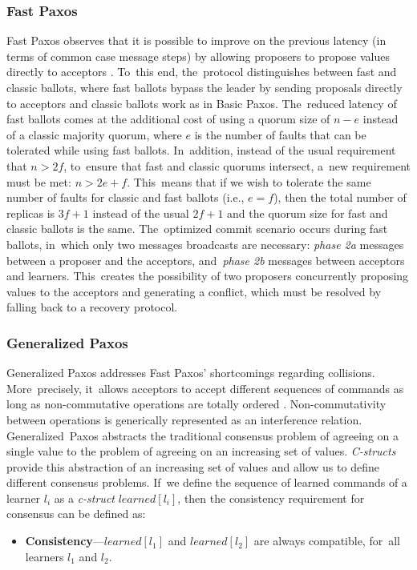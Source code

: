 \documentclass[algorithms,article,accept,moreauthors,pdftex,10pt,a4paper]{Definitions/mdpi}
\begin{document}
\subsubsection{Fast Paxos}
Fast Paxos observes that it is possible to improve on the previous latency (in terms of common case message steps) by allowing proposers to propose values directly to acceptors \cite{L06}. To~this end, the~protocol distinguishes between fast and classic ballots, where fast ballots bypass the leader by sending proposals directly to acceptors and classic ballots work as in Basic Paxos. The~reduced latency of fast ballots comes at the additional cost of using a quorum size of $n-e$ instead of a classic majority quorum, where $e$ is the number of faults that can be tolerated while using fast ballots. In~addition, instead of the usual requirement that $n> 2f$, to~ensure that fast and classic quorums intersect, a~new requirement must be met: $n > 2e+f$. This~means that if we wish to tolerate the same number of faults for classic and fast ballots (i.e., $e=f$), then the total number of replicas is $3f+1$ instead of the usual $2f+1$ and the quorum size for fast and classic ballots is the same. The~optimized commit scenario occurs during fast ballots, in~which only two messages broadcasts are necessary: \textit{phase 2a} messages between a proposer and the acceptors, and~\textit{phase 2b} messages between acceptors and learners. This~creates the possibility of two proposers concurrently proposing values to the acceptors and generating a conflict, which must be resolved by falling back to a recovery protocol. \par

\subsubsection{Generalized Paxos}
Generalized Paxos addresses Fast Paxos' shortcomings regarding collisions. More~precisely, it~allows acceptors to accept different sequences of commands as long as non-commutative operations are totally ordered \cite{Lamport2005}. Non-commutativity between operations is generically represented as an interference relation. Generalized~Paxos abstracts the traditional consensus problem of agreeing on a single value to the problem of agreeing on an increasing set of values. \textit{C-structs} provide this abstraction of an increasing set of values and allow us to define different consensus problems. If~we define the sequence of learned commands of a learner $l_i$ as a \textit{c-struct} $learned[l_i]$, then the consistency requirement for consensus can be defined as:
\begin{itemize}
\item \textbf{Consistency}---$learned[l_1]$ and $learned[l_2]$ are always compatible, for~all learners $l_1$ and $l_2$.
\end{itemize}%
\end{document}

